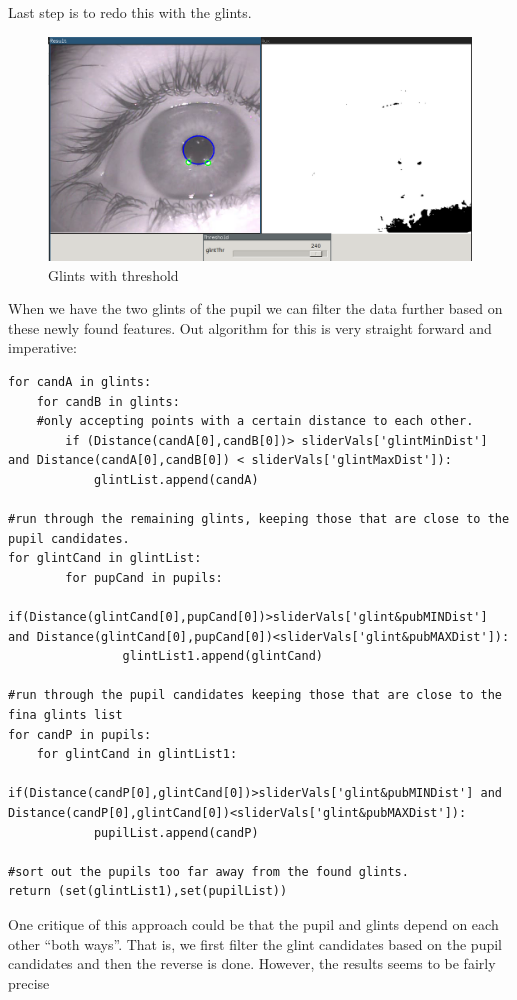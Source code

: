 Last step is to redo this with the glints.

\begin{figure}[htbp]
\centering
\includegraphics{pics/glintsthr.png}
\caption{Glints with threshold \label{glintsthr}}
\end{figure}

When we have the two glints of the pupil we can filter the data further
based on these newly found features. Out algorithm for this is very
straight forward and imperative:

\begin{verbatim}
for candA in glints:
    for candB in glints:
    #only accepting points with a certain distance to each other.
        if (Distance(candA[0],candB[0])> sliderVals['glintMinDist'] and Distance(candA[0],candB[0]) < sliderVals['glintMaxDist']):
            glintList.append(candA)

#run through the remaining glints, keeping those that are close to the pupil candidates.
for glintCand in glintList:
        for pupCand in pupils:
            if(Distance(glintCand[0],pupCand[0])>sliderVals['glint&pubMINDist'] and Distance(glintCand[0],pupCand[0])<sliderVals['glint&pubMAXDist']):
                glintList1.append(glintCand)

#run through the pupil candidates keeping those that are close to the fina glints list
for candP in pupils:
    for glintCand in glintList1:
        if(Distance(candP[0],glintCand[0])>sliderVals['glint&pubMINDist'] and Distance(candP[0],glintCand[0])<sliderVals['glint&pubMAXDist']):
            pupilList.append(candP)

#sort out the pupils too far away from the found glints.
return (set(glintList1),set(pupilList))
\end{verbatim}
One critique of this approach could be that the pupil and glints depend
on each other ``both ways''. That is, we first filter the glint
candidates based on the pupil candidates and then the reverse is done.
However, the results seems to be fairly precise

